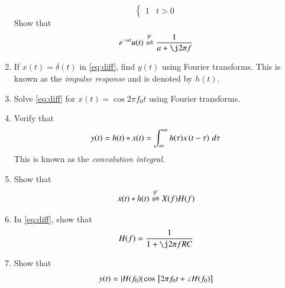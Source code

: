 \documentclass[journal,12pt,twocolumn]{IEEEtran}
\begin{document}
\begin{enumerate}[1.]
\begin{equation}
\begin{cases}
1 & t > 0
\end{cases}
\end{equation}
Show that
\begin{equation}
e^{-at}u(t) \fourier \frac{1}{a+\j 2\pi f}
\end{equation}
\item If $x(t) = \delta(t)$ in \eqref{eq:diff}, find $y(t)$ using Fourier transforms. This is known as the {\em impulse response} and is denoted by $h(t)$.
\item Solve \eqref{eq:diff} for $x(t) = \cos 2\pi f_0 t$ using Fourier transforms.
\item Verify that
\begin{equation}
y(t) = h(t)*x(t) = \int_{\infty}^{\infty}h(\tau)x\left(t-\tau\right)\, d\tau
\end{equation}
This is known as the {\em convolution integral}.
\item Show that
\begin{equation}
x(t)*h(t) \overset{\mathcal{F}}{ \rightleftharpoons} X(f)H(f)
\end{equation}
\item In  \eqref{eq:diff}, show that
\begin{equation}
H(f) = \frac{1}{1+\j 2\pi f RC}
\end{equation}
\item Show that 
\begin{equation}
\label{eq:cos_resp}
y(t) = \left\vert H(f_0)\right\vert\cos{}\left[2\pi f_0 t + \angle H(f_0)\right]
\end{equation}
\end{enumerate}
\end{document}
